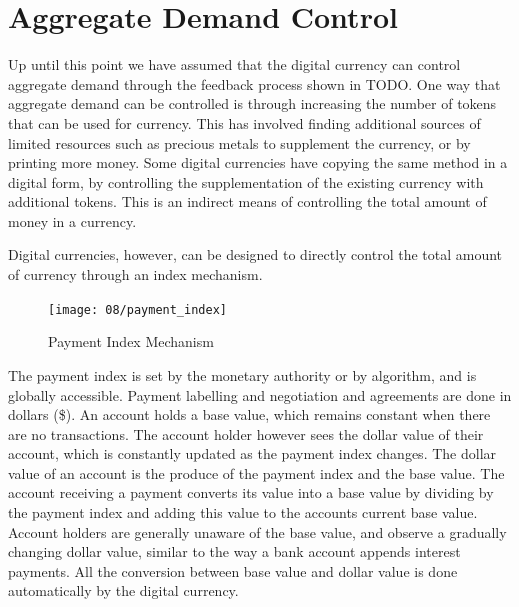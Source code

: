 \section{Aggregate Demand Control}

Up until this point we have assumed that the digital currency can control aggregate demand through
the feedback process shown in TODO. One way that aggregate demand can be controlled is through
increasing the number of tokens that can be used for currency. This has involved finding additional
sources of limited resources such as precious metals to supplement the currency, or by printing more
money. Some digital currencies have copying the same method in a digital form, by controlling the
supplementation of the existing currency with additional tokens. This is an indirect means of
controlling the total amount of money in a currency.

Digital currencies, however, can be designed to directly control the total amount of currency
through an index mechanism.  

\begin{figure}[H]
\centering
\texttt{[image: 08/payment\_index]}
\caption{Payment Index Mechanism}
\label{fig:payment_index}
\end{figure}

The payment index is set by the monetary authority or by algorithm, and is globally accessible.
Payment labelling and negotiation and agreements are done in dollars (\$). An account holds a base
value, which remains constant when there are no transactions. The account holder however sees the
dollar value of their account, which is constantly updated as the payment index changes. The dollar
value of an account is the produce of the payment index and the base value. The account receiving a
payment converts its value into a base value by dividing by the payment index and adding this value
to the accounts current base value. Account holders are generally unaware of the base value, and
observe a gradually changing dollar value, similar to the way a bank account appends interest
payments. All the conversion between base value and dollar value is done automatically by the
digital currency.

